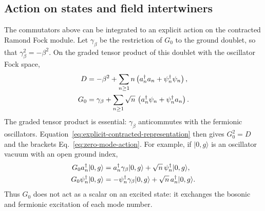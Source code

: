 \documentclass[11pt]{article}
\begin{document}
\subsection{Action on states and field intertwiners}

The commutators above can be integrated to an explicit action on the
contracted Ramond Fock module.  Let \(\gamma_\beta\) be the restriction
of \(G_0\) to the ground doublet, so that
\(\gamma_\beta^2=-\beta^2\).  On the graded tensor product of this
doublet with the oscillator Fock space,
\begin{align}
 D&=-\beta^2+
 \sum_{n\geq1}n
 \left(a_n^\dagger a_n+\psi_n^\dagger\psi_n\right),
 \notag\\
 G_0&=\gamma_\beta+
 \sum_{n\geq1}\sqrt n\,
 \left(a_n^\dagger\psi_n+\psi_n^\dagger a_n\right).
 \label{eq:explicit-contracted-representation}
\end{align}
The graded tensor product is essential: \(\gamma_\beta\) anticommutes
with the fermionic oscillators.  Equation~\eqref{eq:explicit-contracted-representation}
then gives \(G_0^2=D\) and the brackets
Eq.~\eqref{eq:zero-mode-action}.  For example, if \(|0,g\rangle\) is
an oscillator vacuum with an open ground index,
\begin{align}
 G_0a_n^\dagger|0,g\rangle
 &=
 a_n^\dagger\gamma_\beta|0,g\rangle
 +\sqrt n\,\psi_n^\dagger|0,g\rangle,
 \notag\\
 G_0\psi_n^\dagger|0,g\rangle
 &=
 -\psi_n^\dagger\gamma_\beta|0,g\rangle
 +\sqrt n\,a_n^\dagger|0,g\rangle.
 \label{eq:g0-one-particle-action}
\end{align}
Thus \(G_0\) does not act as a scalar on an excited state: it exchanges
the bosonic and fermionic excitation of each mode number.
\end{document}
